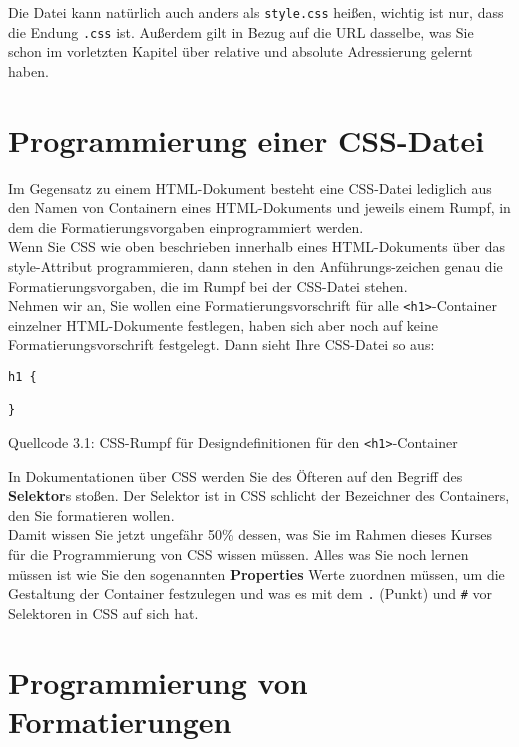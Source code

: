 Die Datei kann natürlich auch anders als \verb|style.css| heißen, wichtig ist nur, dass die Endung \verb|.css| ist. Außerdem gilt in Bezug auf die URL dasselbe, was Sie schon im vorletzten Kapitel über relative und absolute Adressierung gelernt haben.

\section{Programmierung einer CSS-Datei}

Im Gegensatz zu einem HTML-Dokument besteht eine CSS-Datei lediglich aus den Namen von Containern eines HTML-Dokuments und jeweils einem Rumpf, in dem die Formatierungsvorgaben einprogrammiert werden.\\

Wenn Sie CSS wie oben beschrieben innerhalb eines HTML-Dokuments über das style-Attribut programmieren, dann stehen in den Anführungs-zeichen genau die Formatierungsvorgaben, die im Rumpf bei der CSS-Datei stehen.\\

Nehmen wir an, Sie wollen eine Formatierungsvorschrift für alle \verb|<h1>|-Container einzelner HTML-Dokumente festlegen, haben sich aber noch auf keine Formatierungsvorschrift festgelegt. Dann sieht Ihre CSS-Datei so aus:

\begin{verbatim}
h1 {

}
\end{verbatim}
Quellcode 3.1: CSS-Rumpf für Designdefinitionen für den \verb|<h1>|-Container

In Dokumentationen über CSS werden Sie des Öfteren auf den Begriff des \textbf{Selektor}s stoßen. Der Selektor ist in CSS schlicht der Bezeichner des Containers, den Sie formatieren wollen.\\

Damit wissen Sie jetzt ungefähr 50\% dessen, was Sie im Rahmen dieses Kurses für die Programmierung von CSS wissen müssen. Alles was Sie noch lernen müssen ist wie Sie den sogenannten \textbf{Properties} Werte zuordnen müssen, um die Gestaltung der Container festzulegen und was es mit dem \verb|.| (Punkt) und \verb|#| vor Selektoren in CSS auf sich hat.

\section{Programmierung von Formatierungen}


